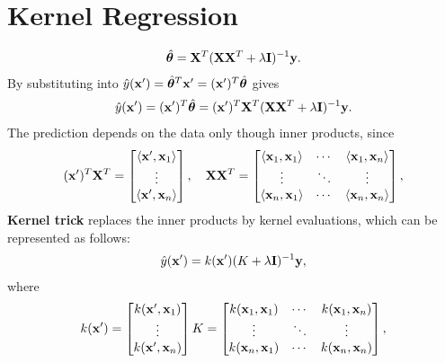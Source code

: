 \section{Kernel Regression}
\begin{align*}
	\hat{\boldsymbol{\theta}} = \mathbf{X}^T(\mathbf{X}\mathbf{X}^T+\lambda\mathbf{I})^{-1}{\mathbf{y}}.
\end{align*}
By substituting into $\hat{y}({\mathbf{x}}') = \hat{\boldsymbol{\theta}}^T{\mathbf{x}}' = ({\mathbf{x}}')^T\hat{\boldsymbol{\theta}}$ gives
\begin{align*}
	\hat{y}({\mathbf{x}}') = ({\mathbf{x}}')^T\hat{\boldsymbol{\theta}} = ({\mathbf{x}}')^T\mathbf{X}^T(\mathbf{X}\mathbf{X}^T+\lambda\mathbf{I})^{-1}{\mathbf{y}}.
\end{align*}
The prediction depends on the data only though inner products, since
\begin{align*}
	({\mathbf{x}}')^T\mathbf{X}^T = \begin{bmatrix}
		\langle {\mathbf{x}}', {\mathbf{x}}_1 \rangle\\
		\vdots\\
		\langle {\mathbf{x}}', {\mathbf{x}}_n \rangle
	\end{bmatrix}, \quad
	\mathbf{X}\mathbf{X}^T = \begin{bmatrix}
		\langle {\mathbf{x}}_1, {\mathbf{x}}_1 \rangle & \cdots & \langle {\mathbf{x}}_1, {\mathbf{x}}_n \rangle\\
		\vdots & \ddots & \vdots\\
		\langle {\mathbf{x}}_n, {\mathbf{x}}_1 \rangle & \cdots & \langle {\mathbf{x}}_n, {\mathbf{x}}_n \rangle
	\end{bmatrix},
\end{align*}
\textbf{Kernel trick} replaces the inner products by kernel evaluations, which can be represented as follows:
\begin{align*}
	\hat{y}({\mathbf{x}}') = k({\mathbf{x}}')(K+\lambda \mathbf{I})^{-1}{\mathbf{y}},
\end{align*}
where 
\begin{align*}
	k({\mathbf{x}}') = \begin{bmatrix}
		k({\mathbf{x}}', {\mathbf{x}}_1)\\
		\vdots\\
		k({\mathbf{x}}', {\mathbf{x}}_n)
	\end{bmatrix}
	K = \begin{bmatrix}
		k({\mathbf{x}}_1, {\mathbf{x}}_1) & \cdots & k({\mathbf{x}}_1, {\mathbf{x}}_n)\\
		\vdots & \ddots & \vdots\\
		k({\mathbf{x}}_n, {\mathbf{x}}_1) & \cdots & k({\mathbf{x}}_n, {\mathbf{x}}_n)
	\end{bmatrix},
\end{align*}

